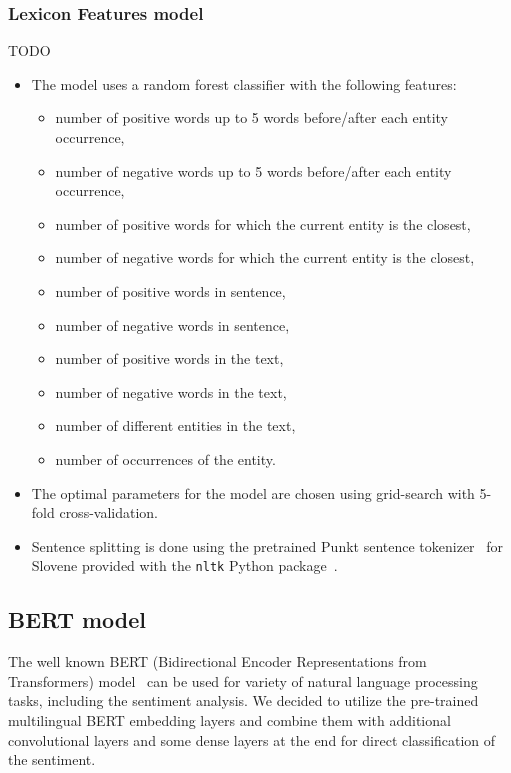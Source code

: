 \documentclass[11pt,a4paper]{article}
\begin{document}
\subsubsection{Lexicon Features model}

TODO
\begin{itemize}
    \item The model uses a random forest classifier with the following features:
    \begin{itemize}
        \item number of positive words up to 5 words before/after each entity occurrence,
        \item number of negative words up to 5 words before/after each entity occurrence,
        \item number of positive words for which the current entity is the closest,
        \item number of negative words for which the current entity is the closest,
        \item number of positive words in sentence,
        \item number of negative words in sentence,
        \item number of positive words in the text,
        \item number of negative words in the text,
        \item number of different entities in the text,
        \item number of occurrences of the entity.
    \end{itemize}
    \item The optimal parameters for the model are chosen using grid-search with 5-fold cross-validation.
    \item Sentence splitting is done using the pretrained Punkt sentence tokenizer~\cite{kiss2006unsupervised} for Slovene provided with the \texttt{nltk} Python package~\cite{bird2009natural}.
\end{itemize}

\subsection{BERT model}

The well known BERT (Bidirectional Encoder Representations from Transformers) model~\cite{devlin2018bert} can be used for variety of natural language processing tasks, including the sentiment analysis.
We decided to utilize the pre-trained multilingual BERT embedding layers and combine them with additional convolutional layers and some dense layers at the end for direct classification of the sentiment.
\end{document}
